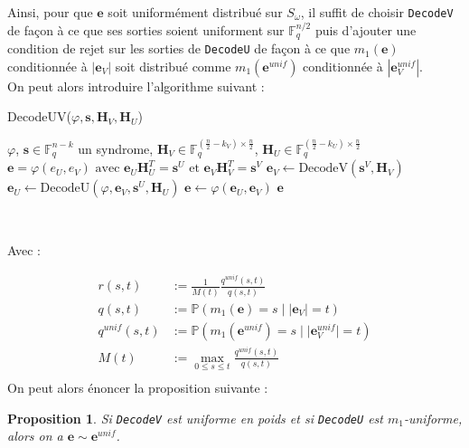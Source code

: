 \documentclass[12pt]{article}
\theoremstyle{plain}
\newtheorem{propo}[thm]{Proposition}
\newcommand{\F}{\mathbb{F}}
\newcommand{\e}{\mathbf{e}}
\newcommand{\s}{\mathbf{s}}
\begin{document}
\noindent Ainsi, pour que $\mathbf{e}$ soit uniformément distribué sur $S_\omega$, il suffit de choisir \verb|DecodeV| de façon à ce que ses sorties soient uniforment sur $\F_q^{n/2}$ puis d'ajouter une condition de rejet sur les sorties de \verb|DecodeU| de façon à ce que $m_1(\mathbf{e})$ conditionnée à $|\mathbf{e}_V|$ soit distribué comme $m_1(\mathbf{e}^{unif})$ conditionnée à $|\mathbf{e}_V^{unif}|$. \\
On peut alors introduire l'algorithme suivant :
\begin{algorithm}
	\caption{DecodeUV($\varphi, \s, \mathbf{H}_V, \mathbf{H}_U$)}
	\begin{algorithmic}[1]
   	 	\REQUIRE $\varphi$, $\s \in \F_q^{n-k}$ un syndrome, $\mathbf{H}_V \in \F_q^{(\frac{n}{2} - k_V) \times \frac{n}{2}}$, $\mathbf{H}_U \in \F_q^{(\frac{n}{2} - k_U) \times \frac{n}{2}}$
   	 	\ENSURE $\e = \varphi(e_U, e_V) \text{ avec } \e_U\mathbf{H}_U^T = \s^U \text{ et } \e_V\mathbf{H}_V^T = \s^V$
    	\STATE $\e_V \leftarrow \text {DecodeV}(\s^V,\mathbf{H}_V)$
    	\REPEAT 
    	\STATE $\e_U \leftarrow \text {DecodeU}(\varphi, \e_V, \s^U, \mathbf{H}_U)$
    	\STATE $\e \leftarrow \varphi(\e_U,\e_V)$
    	\UNTIL {$\text{rand}([0,1]) > \mathbf{r}_U(|\e_V|, m_1(\e)$}
    	\RETURN $\e$
    \end{algorithmic}
\end{algorithm}\


\noindent Avec :

\begin{equation*}
   \begin{split}
    r(s,t) &:= \frac{1}{M(t)}\frac{q^{unif}(s,t)}{q(s,t)} \\
    q(s,t) &:= \mathbb{P}(m_1(\mathbf{e})=s\;|\;|\mathbf{e}_V|=t)\\[.6cm]
    q^{unif}(s,t) &:= \mathbb{P}(m_1(\mathbf{e}^{unif})=s\;|\;|\mathbf{e}^{unif}_V|=t)\\[.6cm]
    M(t) &:= \max_{0 \leq s \leq t} \frac{q^{unif}(s,t)}{q(s,t)}\\[.6cm]
    \end{split}
\end{equation*}
On peut alors énoncer la proposition suivante :


\begin{propo}
Si \verb|DecodeV| est uniforme en poids et si \verb|DecodeU| est $m_1$-uniforme, alors on a $\mathbf{e}\sim\mathbf{e}^{unif}$.
\end{propo}
\end{document}
